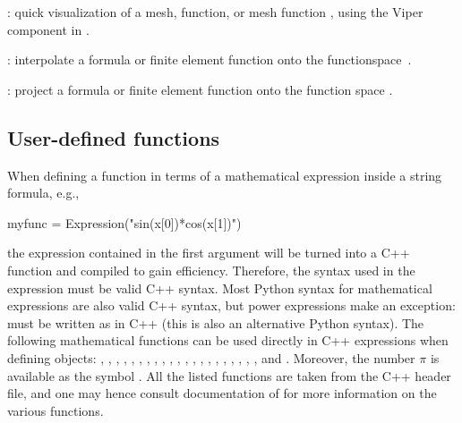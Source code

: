 \begin{trivlist}
  \item[\emp{plot(q)}:] quick visualization of a mesh, function, or mesh
  function , using the Viper component in \fenics{}.

  \item[\emp{interpolate(func, V)}:] interpolate a formula or finite
  element function  onto the function\break space~.

  \item[\emp{project(func, V)}:] project a formula or finite element
  function  onto the function space .
\end{trivlist}

\subsection{User-defined functions}
\label{langtangen:app:cpp:functions}


When defining a function in terms of a mathematical expression inside
a string formula, e.g.,
\begin{python}
myfunc = Expression("sin(x[0])*cos(x[1])")
\end{python}
the expression contained in the first argument will be turned into a C++
function and compiled to gain efficiency. Therefore, the syntax used
in the expression must be valid C++ syntax.  Most Python syntax for
mathematical expressions are also valid C++ syntax, but power expressions
make an exception:  must be written as 
in C++ (this is also an alternative Python syntax).  The following
mathematical functions can be used directly in C++ expressions when
defining  objects: , , ,
, , , , , ,
, , , , , ,
, , , , , ,
and .  Moreover, the number $\pi$ is available as the symbol
.  All the listed functions are taken from the  C++
header file, and one may hence consult documentation of 
for more information on the various functions.

